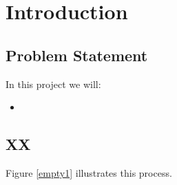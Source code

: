 \documentclass[11pt]{report}
\begin{document}
\begin{tabular}{ll}

\end{tabular}	


\chapter{Introduction}


\section{Problem Statement}


In this project we will:

\begin{itemize}
\item 
\end{itemize}






\section{XX}

Figure \ref{empty1} illustrates this process.
\end{document}
